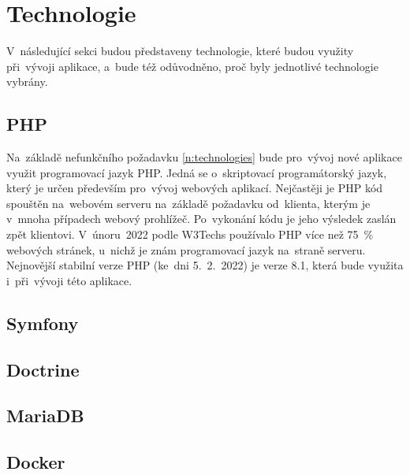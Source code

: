 \section{Technologie}
V~následující sekci budou představeny technologie, které budou využity při~vývoji aplikace, a~bude též odůvodněno, proč byly jednotlivé technologie vybrány.

\subsection{PHP}
Na~základě nefunkčního požadavku \ref{n:technologies} bude pro~vývoj nové aplikace využit programovací jazyk PHP. Jedná se o~skriptovací programátorský jazyk, který je určen především pro~vývoj webových aplikací. Nejčastěji je PHP kód spouštěn na~webovém serveru na~základě požadavku od~klienta, kterým je v~mnoha případech webový prohlížeč. Po~vykonání kódu je jeho výsledek zaslán zpět klientovi. \cite{php_intro_1, php_intro_2} V~únoru~2022 podle W3Techs používalo PHP více než 75~\% webových stránek, u~nichž je znám programovací jazyk na~straně serveru. \cite{php_w3techs} Nejnovější stabilní verze PHP (ke~dni 5.~2.~2022) je verze 8.1\cite{php_version}, která bude využita i~při~vývoji této aplikace.

\subsection{Symfony}

\subsection{Doctrine}

\subsection{MariaDB}

\subsection{Docker}
